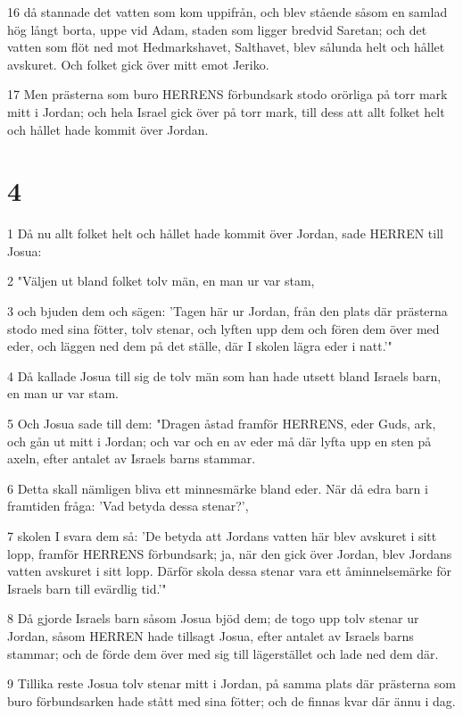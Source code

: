 \par 16 då stannade det vatten som kom uppifrån, och blev stående såsom en samlad hög långt borta, uppe vid Adam, staden som ligger bredvid Saretan; och det vatten som flöt ned mot Hedmarkshavet, Salthavet, blev sålunda helt och hållet avskuret. Och folket gick över mitt emot Jeriko.
\par 17 Men prästerna som buro HERRENS förbundsark stodo orörliga på torr mark mitt i Jordan; och hela Israel gick över på torr mark, till dess att allt folket helt och hållet hade kommit över Jordan.

\chapter{4}

\par 1 Då nu allt folket helt och hållet hade kommit över Jordan, sade HERREN till Josua:
\par 2 "Väljen ut bland folket tolv män, en man ur var stam,
\par 3 och bjuden dem och sägen: 'Tagen här ur Jordan, från den plats där prästerna stodo med sina fötter, tolv stenar, och lyften upp dem och fören dem över med eder, och läggen ned dem på det ställe, där I skolen lägra eder i natt.'"
\par 4 Då kallade Josua till sig de tolv män som han hade utsett bland Israels barn, en man ur var stam.
\par 5 Och Josua sade till dem: "Dragen åstad framför HERRENS, eder Guds, ark, och gån ut mitt i Jordan; och var och en av eder må där lyfta upp en sten på axeln, efter antalet av Israels barns stammar.
\par 6 Detta skall nämligen bliva ett minnesmärke bland eder. När då edra barn i framtiden fråga: 'Vad betyda dessa stenar?',
\par 7 skolen I svara dem så: 'De betyda att Jordans vatten här blev avskuret i sitt lopp, framför HERRENS förbundsark; ja, när den gick över Jordan, blev Jordans vatten avskuret i sitt lopp. Därför skola dessa stenar vara ett åminnelsemärke för Israels barn till evärdlig tid.'"
\par 8 Då gjorde Israels barn såsom Josua bjöd dem; de togo upp tolv stenar ur Jordan, såsom HERREN hade tillsagt Josua, efter antalet av Israels barns stammar; och de förde dem över med sig till lägerstället och lade ned dem där.
\par 9 Tillika reste Josua tolv stenar mitt i Jordan, på samma plats där prästerna som buro förbundsarken hade stått med sina fötter; och de finnas kvar där ännu i dag.

